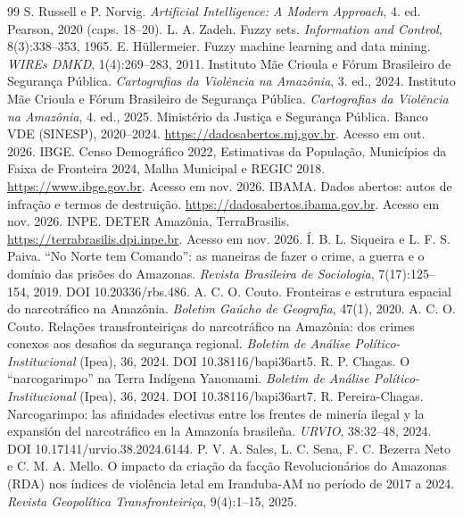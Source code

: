 \documentclass[10pt,a4paper,twocolumn]{article}
\begin{document}
\begin{thebibliography}{99}\small
{} S. Russell e P. Norvig. \emph{Artificial Intelligence: A Modern Approach}, 4. ed. Pearson, 2020 (caps. 18--20).
 L. A. Zadeh. Fuzzy sets. \emph{Information and Control}, 8(3):338--353, 1965.
 E. Hüllermeier. Fuzzy machine learning and data mining. \emph{WIREs DMKD}, 1(4):269--283, 2011.
 Instituto Mãe Crioula e Fórum Brasileiro de Segurança Pública. \emph{Cartografias da Violência na Amazônia}, 3. ed., 2024.
 Instituto Mãe Crioula e Fórum Brasileiro de Segurança Pública. \emph{Cartografias da Violência na Amazônia}, 4. ed., 2025.
 Ministério da Justiça e Segurança Pública. Banco VDE (SINESP), 2020--2024. \url{https://dadosabertos.mj.gov.br}. Acesso em out. 2026.
 IBGE. Censo Demográfico 2022, Estimativas da População, Municípios da Faixa de Fronteira 2024, Malha Municipal e REGIC 2018. \url{https://www.ibge.gov.br}. Acesso em nov. 2026.
 IBAMA. Dados abertos: autos de infração e termos de destruição. \url{https://dadosabertos.ibama.gov.br}. Acesso em nov. 2026.
 INPE. DETER Amazônia, TerraBrasilis. \url{https://terrabrasilis.dpi.inpe.br}. Acesso em nov. 2026.
 Í. B. L. Siqueira e L. F. S. Paiva. ``No Norte tem Comando'': as maneiras de fazer o crime, a guerra e o domínio das prisões do Amazonas. \emph{Revista Brasileira de Sociologia}, 7(17):125--154, 2019. DOI 10.20336/rbs.486.
 A. C. O. Couto. Fronteiras e estrutura espacial do narcotráfico na Amazônia. \emph{Boletim Gaúcho de Geografia}, 47(1), 2020.
 A. C. O. Couto. Relações transfronteiriças do narcotráfico na Amazônia: dos crimes conexos aos desafios da segurança regional. \emph{Boletim de Análise Político-Institucional} (Ipea), 36, 2024. DOI 10.38116/bapi36art5.
 R. P. Chagas. O ``narcogarimpo'' na Terra Indígena Yanomami. \emph{Boletim de Análise Político-Institucional} (Ipea), 36, 2024. DOI 10.38116/bapi36art7.
 R. Pereira-Chagas. Narcogarimpo: las afinidades electivas entre los frentes de minería ilegal y la expansión del narcotráfico en la Amazonía brasileña. \emph{URVIO}, 38:32--48, 2024. DOI 10.17141/urvio.38.2024.6144.
 P. V. A. Sales, L. C. Sena, F. C. Bezerra Neto e C. M. A. Mello. O impacto da criação da facção Revolucionários do Amazonas (RDA) nos índices de violência letal em Iranduba-AM no período de 2017 a 2024. \emph{Revista Geopolítica Transfronteiriça}, 9(4):1--15, 2025.

\end{thebibliography}
\end{document}

